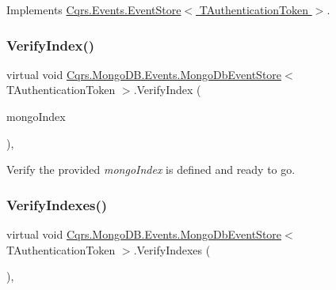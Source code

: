 Implements \hyperlink{classCqrs_1_1Events_1_1EventStore_aedb71ca0ddf21220e323bc60ad7508cd_aedb71ca0ddf21220e323bc60ad7508cd}{Cqrs.\+Events.\+Event\+Store$<$ T\+Authentication\+Token $>$}.

\mbox{\label{classCqrs_1_1MongoDB_1_1Events_1_1MongoDbEventStore_a6a6f0303cd412974d90be87d281e81f5_a6a6f0303cd412974d90be87d281e81f5}} 
\subsubsection{\texorpdfstring{Verify\+Index()}{VerifyIndex()}}
{\footnotesize\ttfamily virtual void \hyperlink{classCqrs_1_1MongoDB_1_1Events_1_1MongoDbEventStore}{Cqrs.\+Mongo\+D\+B.\+Events.\+Mongo\+Db\+Event\+Store}$<$ T\+Authentication\+Token $>$.Verify\+Index (\begin{DoxyParamCaption}\item[{\hyperlink{classCqrs_1_1MongoDB_1_1DataStores_1_1Indexes_1_1MongoDbIndex}{Mongo\+Db\+Index}$<$ \hyperlink{classCqrs_1_1MongoDB_1_1Events_1_1MongoDbEventData}{Mongo\+Db\+Event\+Data} $>$}]{mongo\+Index }\end{DoxyParamCaption})\hspace{0.3cm}{\ttfamily [protected]}, {\ttfamily [virtual]}}



Verify the provided {\itshape mongo\+Index}  is defined and ready to go. 

\mbox{\label{classCqrs_1_1MongoDB_1_1Events_1_1MongoDbEventStore_a60ae02928a3ae8cb99d46f6c340b5138_a60ae02928a3ae8cb99d46f6c340b5138}} 
\subsubsection{\texorpdfstring{Verify\+Indexes()}{VerifyIndexes()}}
{\footnotesize\ttfamily virtual void \hyperlink{classCqrs_1_1MongoDB_1_1Events_1_1MongoDbEventStore}{Cqrs.\+Mongo\+D\+B.\+Events.\+Mongo\+Db\+Event\+Store}$<$ T\+Authentication\+Token $>$.Verify\+Indexes (\begin{DoxyParamCaption}{ }\end{DoxyParamCaption})\hspace{0.3cm}{\ttfamily [protected]}, {\ttfamily [virtual]}}



